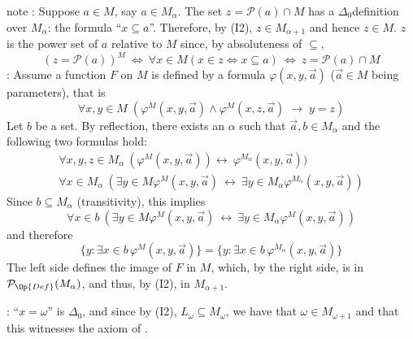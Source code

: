 \documentclass[letterpaper,10pt,english]{jupyterBook}
\begin{document}
\begin{sphinxadmonition}{note}
\sphinxAtStartPar
{}: Suppose \(a \in M\), say \(a \in M_\alpha\). The set \(z = \mathcal{P}(a)\cap M\) has a \(\Delta_0\)\sphinxhyphen{}definition over \(M_\alpha\): the formula “\(x \subseteq a\)”. Therefore, by (I2), \(z \in M_{\alpha+1}\) and hence \(z \in M\). \(z\) is the power set of \(a\) relative to \(M\) since, by absoluteness of \(\subseteq\),
\begin{equation*}
	(z = \mathcal{P}(a))^M \: \iff \: \forall x \in M (x \in z \iff x \subseteq a) \: \iff \: z = \mathcal{P}(a) \cap M
\end{equation*}
\sphinxAtStartPar
{}: Assume a function \(F\) on \(M\) is defined by a formula \(\varphi(x,y,\vec{a})\) (\(\vec{a} \in M\) being parameters), that is
\begin{equation*}
	\forall x,y \in M \; (\varphi^M(x,y,\vec{a}) \wedge \varphi^M(x,z,\vec{a}) \; \to \; y=z )
\end{equation*}
\sphinxAtStartPar
Let \(b \) be a set. By reflection, there exists an \(\alpha\) such that \(\vec{a}, b \in M_\alpha\) and the following two formulas hold:
\begin{gather*}
	\forall x,y, z \in M_\alpha \: (\varphi^M(x,y,\vec{a})) \leftrightarrow \: \varphi^{M_\alpha}(x,y,\vec{a})) \\
	\forall x \in M_\alpha \: (\exists y\in M \varphi^M(x,y,\vec{a}) \: \leftrightarrow \: \exists y \in M_\alpha \varphi^{M_\alpha}(x,y,\vec{a}))
\end{gather*}
\sphinxAtStartPar
Since \(b \subseteq M_{\alpha}\) (transitivity), this implies
\begin{equation*}
	\forall x \in b \: (\exists y\in M \varphi^M(x,y,\vec{a}) \: \leftrightarrow \: \exists y \in M_\alpha \varphi^M(x,y,\vec{a}))
\end{equation*}
\sphinxAtStartPar
and therefore
\begin{equation*}
	\{ y : \exists x \in b \, \varphi^{M}(x,y,\vec{a}) \} = \{ y : \exists x \in b \, \varphi^{M_\alpha}(x,y,\vec{a}) \}
\end{equation*}
\sphinxAtStartPar
The left side defines the image of \(F\) in \(M\), which, by the right side, is in \(\mathcal{P}_{\Op{Def}}(M_\alpha)\), and thus, by (I2), in \(M_{\alpha+1}\).

\sphinxAtStartPar
{}: “\(x = \omega\)” is \(\Delta_0\), and since by (I2), \(L_\omega \subseteq M_\omega\), we have that \(\omega \in M_{\omega+1}\) and that this witnesses the axiom of .
\end{sphinxadmonition}
\end{document}
